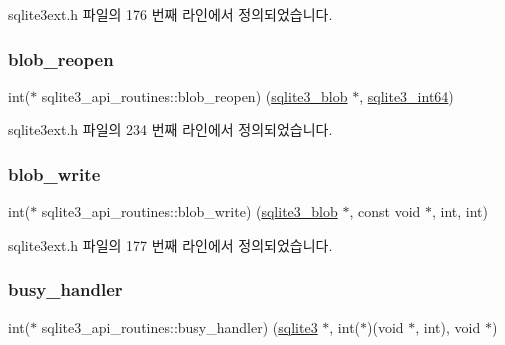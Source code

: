 sqlite3ext.\+h 파일의 176 번째 라인에서 정의되었습니다.

\mbox{\label{structsqlite3__api__routines_a457411772bf6cf8883acd7a27526a68f}} 
\subsubsection{\texorpdfstring{blob\+\_\+reopen}{blob\_reopen}}
{\footnotesize\ttfamily int($\ast$ sqlite3\+\_\+api\+\_\+routines\+::blob\+\_\+reopen) (\hyperlink{sqlite3_8h_a3eb4857c157c542bb3fb7d8cbf38a662}{sqlite3\+\_\+blob} $\ast$, \hyperlink{sqlite3_8h_a0a4d3e6c1ad46f90e746b920ab6ca0d2}{sqlite3\+\_\+int64})}



sqlite3ext.\+h 파일의 234 번째 라인에서 정의되었습니다.

\mbox{\label{structsqlite3__api__routines_a3a402cb876e7d4e4f60d70924e5cc04d}} 
\subsubsection{\texorpdfstring{blob\+\_\+write}{blob\_write}}
{\footnotesize\ttfamily int($\ast$ sqlite3\+\_\+api\+\_\+routines\+::blob\+\_\+write) (\hyperlink{sqlite3_8h_a3eb4857c157c542bb3fb7d8cbf38a662}{sqlite3\+\_\+blob} $\ast$, const void $\ast$, int, int)}



sqlite3ext.\+h 파일의 177 번째 라인에서 정의되었습니다.

\mbox{\label{structsqlite3__api__routines_ad7b688e04d388cdeb13d4c06fedb1c46}} 
\subsubsection{\texorpdfstring{busy\+\_\+handler}{busy\_handler}}
{\footnotesize\ttfamily int($\ast$ sqlite3\+\_\+api\+\_\+routines\+::busy\+\_\+handler) (\hyperlink{sqlite3_8h_a0ef6f2646262c8a9b24368d8ac140f69}{sqlite3} $\ast$, int($\ast$)(void $\ast$, int), void $\ast$)}



